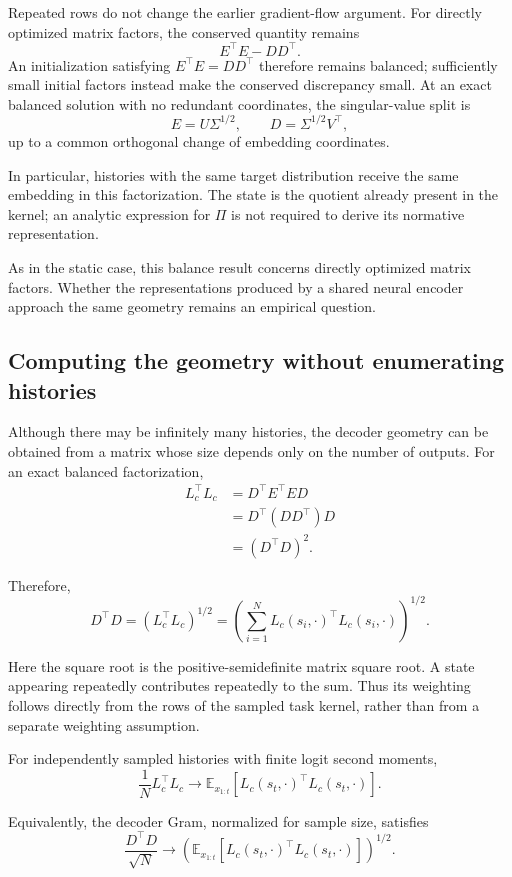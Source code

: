 Repeated rows do not change the earlier gradient-flow argument. For directly optimized matrix factors, the conserved quantity remains
\[
E^\top E-DD^\top.
\]
An initialization satisfying $E^\top E=DD^\top$ therefore remains balanced; sufficiently small initial factors instead make the conserved discrepancy small. At an exact balanced solution with no redundant coordinates, the singular-value split is
\[
\boxed{
E=U\Sigma^{1/2},
\qquad
D=\Sigma^{1/2}V^\top,
}
\]
up to a common orthogonal change of embedding coordinates.

In particular, histories with the same target distribution receive the same embedding in this factorization. The state is the quotient already present in the kernel; an analytic expression for $\Pi$ is not required to derive its normative representation.

As in the static case, this balance result concerns directly optimized matrix factors. Whether the representations produced by a shared neural encoder approach the same geometry remains an empirical question.

\subsection{Computing the geometry without enumerating histories}

Although there may be infinitely many histories, the decoder geometry can be obtained from a matrix whose size depends only on the number of outputs. For an exact balanced factorization,
\[
\begin{aligned}
L_c^\top L_c
&=
D^\top E^\top E D\\
&=
D^\top(DD^\top)D\\
&=
(D^\top D)^2.
\end{aligned}
\]

Therefore,
\[
\boxed{
D^\top D
=
\left(L_c^\top L_c\right)^{1/2}
=
\left(
\sum_{i=1}^N
L_c(s_i,\cdot)^\top L_c(s_i,\cdot)
\right)^{1/2}.
}
\]

Here the square root is the positive-semidefinite matrix square root. A state appearing repeatedly contributes repeatedly to the sum. Thus its weighting follows directly from the rows of the sampled task kernel, rather than from a separate weighting assumption.

For independently sampled histories with finite logit second moments,
\[
\frac{1}{N}L_c^\top L_c
\longrightarrow
\mathbb E_{x_{1:t}}
\left[
L_c(s_t,\cdot)^\top L_c(s_t,\cdot)
\right].
\]

Equivalently, the decoder Gram, normalized for sample size, satisfies
\[
\boxed{
\frac{D^\top D}{\sqrt N}
\longrightarrow
\left(
\mathbb E_{x_{1:t}}
\left[
L_c(s_t,\cdot)^\top L_c(s_t,\cdot)
\right]
\right)^{1/2}.
}
\]

